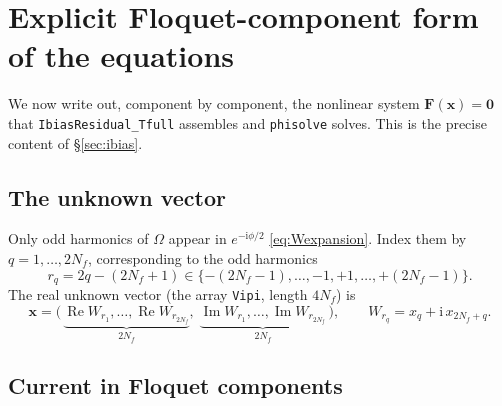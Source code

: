 \documentclass[11pt,a4paper]{article}
\newcommand{\ii}{\mathrm{i}}
\newcommand{\Real}{\operatorname{Re}}
\newcommand{\Imag}{\operatorname{Im}}
\begin{document}
\section{Explicit Floquet-component form of the equations}
\label{sec:explicit}

We now write out, component by component, the nonlinear system
$\mathbf F(\mathbf x)=\mathbf 0$ that \texttt{IbiasResidual\_Tfull} assembles and
\texttt{phisolve} solves.  This is the precise content of \S\ref{sec:ibias}.

\subsection{The unknown vector}

Only odd harmonics of $\Omega$ appear in $e^{-\ii\phi/2}$
\eqref{eq:Wexpansion}.  Index them by $q=1,\dots,2N_f$, corresponding to the odd
harmonics
\begin{equation}
  r_q = 2q-(2N_f+1)\in\{-(2N_f-1),\dots,-1,+1,\dots,+(2N_f-1)\}.
\end{equation}
The real unknown vector (the array \texttt{Vipi}, length $4N_f$) is
\begin{equation}
  \mathbf x = \big(\,\underbrace{\Real W_{r_1},\dots,\Real W_{r_{2N_f}}}_{2N_f},\;
                     \underbrace{\Imag W_{r_1},\dots,\Imag W_{r_{2N_f}}}_{2N_f}\,\big),
  \qquad
  W_{r_q}=x_q+\ii\,x_{2N_f+q}.
  \label{eq:unknowns}
\end{equation}

\subsection{Current in Floquet components}
\label{sec:current_floquet}
\end{document}
